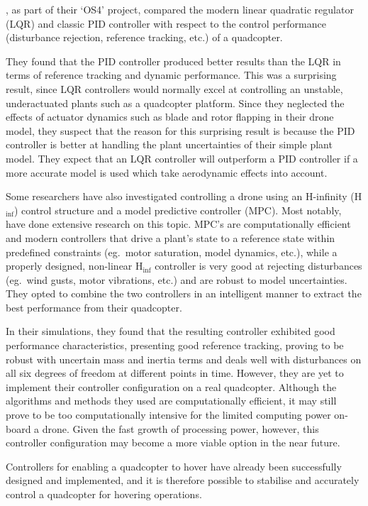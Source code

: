 \cite{bouabdallah2004pid}, as part of their `OS4' project, compared the modern linear quadratic regulator (LQR) and classic PID controller with respect to the control performance (disturbance rejection, reference tracking, etc.) of a quadcopter.

They found that the PID controller produced better results than the LQR in terms of reference tracking and dynamic performance. This was a surprising result, since LQR controllers would normally excel at controlling an unstable, underactuated plants such as a quadcopter platform. Since they neglected the effects of actuator dynamics such as blade and rotor flapping in their drone model, they suspect that the reason for this surprising result is because the PID controller is better at handling the plant uncertainties of their simple plant model. They expect that an LQR controller will outperform a PID controller if a more accurate model is used which take aerodynamic effects into account. 

Some researchers have also investigated controlling a drone using an H-infinity (H$_{\inf}$) control structure and a model predictive controller (MPC). Most notably,~\cite{raffo2010integral} have done extensive research on this topic. MPC's are computationally efficient and modern controllers that drive a plant's state to a reference state within predefined constraints (eg.\ motor saturation, model dynamics, etc.), while a properly designed, non-linear H$_{\inf}$ controller is very good at rejecting disturbances (eg.\ wind gusts, motor vibrations, etc.) and are robust to model uncertainties. They opted to combine the two controllers in an intelligent manner to extract the best performance from their quadcopter. 

In their simulations, they found that the resulting controller exhibited good performance characteristics, presenting good reference tracking, proving to be robust with uncertain mass and inertia terms and deals well with disturbances on all six degrees of freedom at different points in time. However, they are yet to implement their controller configuration on a real quadcopter. Although the algorithms and methods they used are computationally efficient, it may still prove to be too computationally intensive for the limited computing power on-board a drone. Given the fast growth of processing power, however, this controller configuration may become a more viable option in the near future. 

Controllers for enabling a quadcopter to hover have already been successfully designed and implemented, and it is therefore possible to stabilise and accurately control a quadcopter for hovering operations. 

